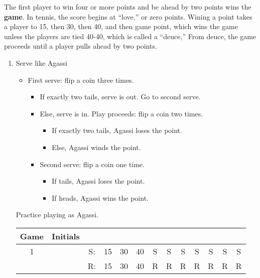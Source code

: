 The first player to win four or more points and be ahead by two points wins the \textbf{game}. In tennis, the score begins at ``love,'' or zero points. Wining a point takes a player to 15, then 30, then 40, and then game point, which wins the game unless the players are tied 40-40, which is called a ``deuce,'' From deuce, the game proceeds until a player pulls ahead by two points.
\begin{enumerate}
	\item Serve like Agassi
	\begin{itemize}
		\item First serve: flip a coin three times.
		\begin{itemize}
			\item If exactly two tails, serve is out. Go to second serve.
			\item Else, serve is in. Play proceeds: flip a coin two times.
			\begin{itemize}
				\item If exactly two tails, Agassi loses the point.
				\item Else, Agassi winds the point.
			\end{itemize}
			\item Second serve: flip a coin one time.
			\begin{itemize}
				\item If tails, Agassi loses the point.
				\item If heads, Agassi wins the point.
			\end{itemize}
		\end{itemize}
	\end{itemize}
	Practice playing as Agassi.
	
	\begin{tabular}{*{13}{c}}
	Game  & Initials&\\
	\hline
	1 & & S: & 15 & 30 & 40 & S &S &S &S &S &S &S\\
	&&    R: & 15 & 30 & 40 & R &R &R &R &R &R &R\\ \hline
	\end{tabular}
	

\end{enumerate}
